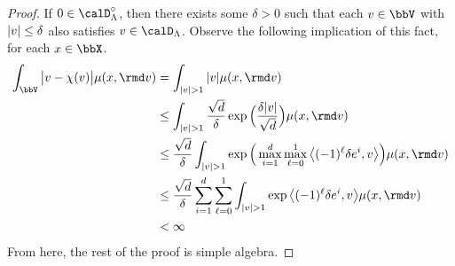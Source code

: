 \begin{proof}
  \label{proof:lemma:no-truncation}
  If $0 \in \odeSpace^\circ$, then there exists some $\delta > 0$ such that each $\vecVar \in \vecSpace$ with $|v|\leq\delta$ also satisfies $\vecVar \in \odeSpace$.
  Observe the following implication of this fact, for each $\stateVar \in \stateSpace$.
  \begin{align*}
    \int_{\vecSpace} \big|\markVar - \trunc(\markVar)\big| \affJump(\stateVar, \rmd\markVar)
    &= \int_{|\markVar|>1} |\markVar| \affJump(\stateVar, \rmd\markVar) \\
    &\leq \int_{|\markVar|>1} \frac{\sqrt{d}}{\delta} \exp\Big(\frac{\delta|\markVar|}{\sqrt d} \Big) \affJump(\stateVar, \rmd\markVar) \\
    &\leq \frac{\sqrt d}{\delta} \int_{|\markVar|>1} \exp\Big(\max_{i=1}^d \max_{\ell=0}^1 \bprj{(-1)^\ell \delta \basisVec^i}{\markVar} \Big) \affJump(\stateVar,\rmd\markVar) \\
    &\leq \frac{\sqrt d}{\delta} \sum_{i=1}^d \sum_{\ell=0}^1 \int_{|\markVar|>1} \exp\bprj{(-1)^\ell \delta \basisVec^i}{\markVar} \affJump(\stateVar,\rmd\markVar) \\
    &< \infty
  \end{align*}
  From here, the rest of the proof is simple algebra.
\end{proof}
